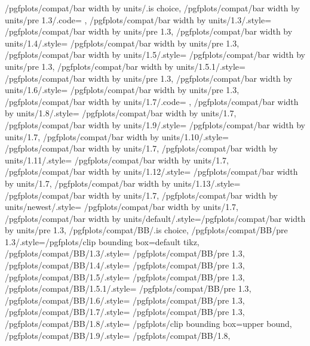 {	%
	/pgfplots/compat/bar width by units/.is choice,
	/pgfplots/compat/bar width by units/pre 1.3/.code=	{\def\b@pgfplots@compat@bar@width@units{1}},%
	/pgfplots/compat/bar width by units/1.3/.style=	{/pgfplots/compat/bar width by units/pre 1.3},
	/pgfplots/compat/bar width by units/1.4/.style=	{/pgfplots/compat/bar width by units/pre 1.3},%
	/pgfplots/compat/bar width by units/1.5/.style=	{/pgfplots/compat/bar width by units/pre 1.3},%
	/pgfplots/compat/bar width by units/1.5.1/.style=	{/pgfplots/compat/bar width by units/pre 1.3},%
	/pgfplots/compat/bar width by units/1.6/.style=	{/pgfplots/compat/bar width by units/pre 1.3},%
	/pgfplots/compat/bar width by units/1.7/.code=		{\def\b@pgfplots@compat@bar@width@units{0}},%
	/pgfplots/compat/bar width by units/1.8/.style=		{/pgfplots/compat/bar width by units/1.7},
	/pgfplots/compat/bar width by units/1.9/.style=		{/pgfplots/compat/bar width by units/1.7},
	/pgfplots/compat/bar width by units/1.10/.style=		{/pgfplots/compat/bar width by units/1.7},
	/pgfplots/compat/bar width by units/1.11/.style=		{/pgfplots/compat/bar width by units/1.7},
	/pgfplots/compat/bar width by units/1.12/.style=		{/pgfplots/compat/bar width by units/1.7},
	/pgfplots/compat/bar width by units/1.13/.style=		{/pgfplots/compat/bar width by units/1.7},
	/pgfplots/compat/bar width by units/newest/.style=	{/pgfplots/compat/bar width by units/1.7},
	/pgfplots/compat/bar width by units/default/.style={/pgfplots/compat/bar width by units/pre 1.3},
	/pgfplots/compat/BB/.is choice,
	/pgfplots/compat/BB/pre 1.3/.style={/pgfplots/clip bounding box=default tikz},%
	/pgfplots/compat/BB/1.3/.style=	{/pgfplots/compat/BB/pre 1.3},
	/pgfplots/compat/BB/1.4/.style=	{/pgfplots/compat/BB/pre 1.3},%
	/pgfplots/compat/BB/1.5/.style=	{/pgfplots/compat/BB/pre 1.3},%
	/pgfplots/compat/BB/1.5.1/.style=	{/pgfplots/compat/BB/pre 1.3},%
	/pgfplots/compat/BB/1.6/.style=	{/pgfplots/compat/BB/pre 1.3},%
	/pgfplots/compat/BB/1.7/.style=	{/pgfplots/compat/BB/pre 1.3},%
	/pgfplots/compat/BB/1.8/.style=	{/pgfplots/clip bounding box=upper bound},%
	/pgfplots/compat/BB/1.9/.style=	{/pgfplots/compat/BB/1.8},%
}
